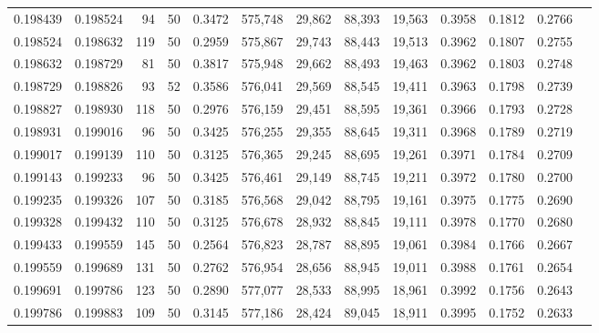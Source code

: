 \begin{tabular}{rrrrrrrrrrrrr}
0.198439 & 0.198524 &    94 &  50 &                                     0.3472 & 575,748 &  29,862 &  88,393 &  19,563 & 0.3958 & 0.1812 & 0.2766 \\
0.198524 & 0.198632 &   119 &  50 &                                     0.2959 & 575,867 &  29,743 &  88,443 &  19,513 & 0.3962 & 0.1807 & 0.2755 \\
0.198632 & 0.198729 &    81 &  50 &                                     0.3817 & 575,948 &  29,662 &  88,493 &  19,463 & 0.3962 & 0.1803 & 0.2748 \\
0.198729 & 0.198826 &    93 &  52 &                                     0.3586 & 576,041 &  29,569 &  88,545 &  19,411 & 0.3963 & 0.1798 & 0.2739 \\
0.198827 & 0.198930 &   118 &  50 &                                     0.2976 & 576,159 &  29,451 &  88,595 &  19,361 & 0.3966 & 0.1793 & 0.2728 \\
0.198931 & 0.199016 &    96 &  50 &                                     0.3425 & 576,255 &  29,355 &  88,645 &  19,311 & 0.3968 & 0.1789 & 0.2719 \\
0.199017 & 0.199139 &   110 &  50 &                                     0.3125 & 576,365 &  29,245 &  88,695 &  19,261 & 0.3971 & 0.1784 & 0.2709 \\
0.199143 & 0.199233 &    96 &  50 &                                     0.3425 & 576,461 &  29,149 &  88,745 &  19,211 & 0.3972 & 0.1780 & 0.2700 \\
0.199235 & 0.199326 &   107 &  50 &                                     0.3185 & 576,568 &  29,042 &  88,795 &  19,161 & 0.3975 & 0.1775 & 0.2690 \\
0.199328 & 0.199432 &   110 &  50 &                                     0.3125 & 576,678 &  28,932 &  88,845 &  19,111 & 0.3978 & 0.1770 & 0.2680 \\
0.199433 & 0.199559 &   145 &  50 &                                     0.2564 & 576,823 &  28,787 &  88,895 &  19,061 & 0.3984 & 0.1766 & 0.2667 \\
0.199559 & 0.199689 &   131 &  50 &                                     0.2762 & 576,954 &  28,656 &  88,945 &  19,011 & 0.3988 & 0.1761 & 0.2654 \\
0.199691 & 0.199786 &   123 &  50 &                                     0.2890 & 577,077 &  28,533 &  88,995 &  18,961 & 0.3992 & 0.1756 & 0.2643 \\
0.199786 & 0.199883 &   109 &  50 &                                     0.3145 & 577,186 &  28,424 &  89,045 &  18,911 & 0.3995 & 0.1752 & 0.2633 \\

\end{tabular}
